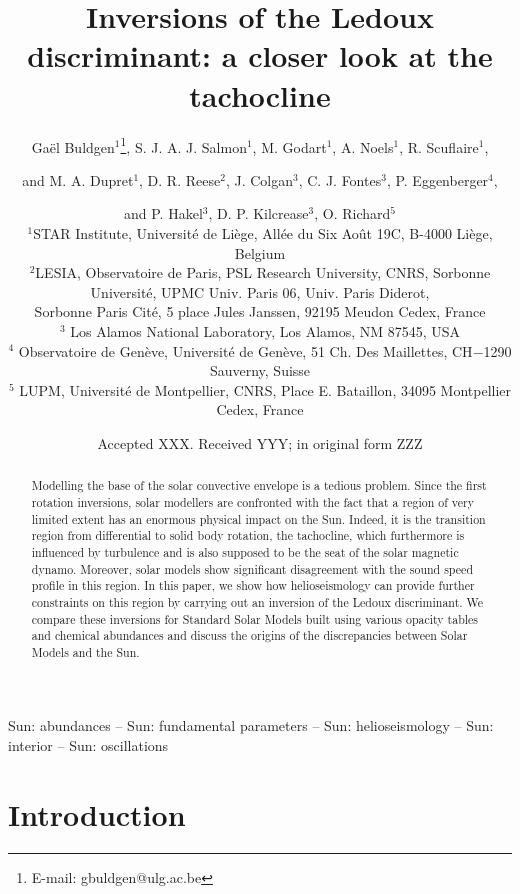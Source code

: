 \documentclass[a4paper,fleqn,usenatbib]{mnras}
\title[Inversions of the Ledoux discriminant]{Inversions of the Ledoux discriminant: a closer look at the tachocline}
\author[G. Buldgen et al.]{
Ga\"el Buldgen$^{1}$\thanks{E-mail: gbuldgen@ulg.ac.be},
 S. J. A. J. Salmon$^{1}$,
 M. Godart$^{1}$,
 A. Noels$^{1}$,
 R. Scuflaire$^{1}$,\and and
 M. A. Dupret$^{1}$, 
 D. R. Reese$^{2}$,
 J. Colgan$^{3}$, 
 C. J. Fontes$^{3}$,
 P. Eggenberger$^{4}$,\and and
 P. Hakel$^{3}$, 
 D. P. Kilcrease$^{3}$, 
 O. Richard$^{5}$
\\
$^{1}$STAR Institute, Universit\'e de Li\`ege, All\'ee du Six Ao\^ut 19C, B-4000 Li\`ege, Belgium\\
$^{2}$LESIA, Observatoire de Paris, PSL Research University, CNRS, Sorbonne Universit\'e, UPMC Univ. Paris 06, Univ. Paris Diderot,\\ Sorbonne Paris Cit\'e, 5 place Jules Janssen, 92195 Meudon Cedex, France \\
$^{3}$ Los Alamos National Laboratory, Los Alamos, NM 87545, USA \\
$^{4}$ Observatoire de Gen\`eve, Universit\'e de Gen\`eve, 51 Ch. Des Maillettes, CH$-$1290 Sauverny, Suisse \\
$^{5}$ LUPM, Universit\'e de Montpellier, CNRS, Place E. Bataillon, 34095 Montpellier Cedex, France 
}
\date{Accepted XXX. Received YYY; in original form ZZZ}
\begin{document}
\label{firstpage}
\pagerange{\pageref{firstpage}--\pageref{lastpage}}
\maketitle

\begin{abstract}
Modelling the base of the solar convective envelope is a tedious problem. Since the first rotation inversions, solar modellers are confronted with the fact that a region of very limited extent has an enormous physical impact on the Sun. Indeed, it is the transition region from differential to solid body rotation, the tachocline, which furthermore is influenced by turbulence and is also supposed to be the seat of the solar magnetic dynamo. Moreover, solar models show significant disagreement with the sound speed profile in this region. In this paper, we show how helioseismology can provide further constraints on this region by carrying out an inversion of the Ledoux discriminant. We compare these inversions for Standard Solar Models built using various opacity tables and chemical abundances and discuss the origins of the discrepancies between Solar Models and the Sun. 
\end{abstract}

\begin{keywords}
Sun: abundances -- Sun: fundamental parameters -- Sun: helioseismology -- Sun: interior -- Sun: oscillations
\end{keywords}



\section{Introduction}\label{SecIntroA}
\end{document}
